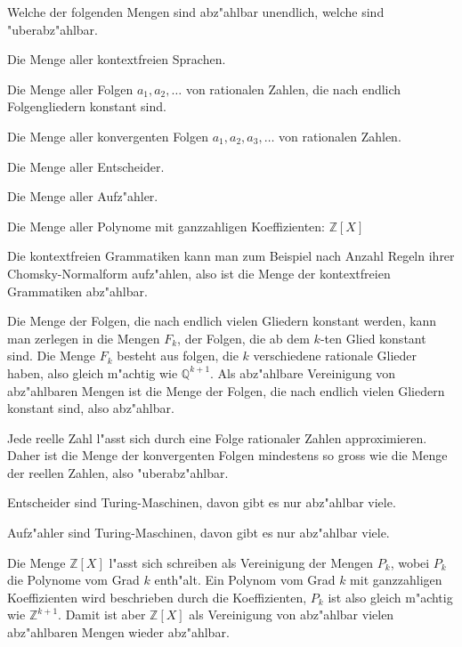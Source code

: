 Welche der folgenden Mengen sind abz"ahlbar unendlich, welche sind
"uberabz"ahlbar.
\begin{teilaufgaben}
\item Die Menge aller kontextfreien Sprachen.
\item Die Menge aller Folgen $a_1,a_2,\dots$ von rationalen Zahlen,
die nach endlich Folgengliedern konstant sind.
\item Die Menge aller konvergenten Folgen $a_1,a_2,a_3,\dots$ von
rationalen Zahlen.
\item Die Menge aller Entscheider.
\item Die Menge aller Aufz"ahler.
\item Die Menge aller Polynome mit ganzzahligen Koeffizienten:
${\mathbb Z}[X]$
\end{teilaufgaben}

\begin{loesung}
\begin{teilaufgaben}
\item Die kontextfreien Grammatiken kann man zum Beispiel nach
Anzahl Regeln ihrer Chomsky-Normalform aufz"ahlen, also ist
die Menge der kontextfreien Grammatiken abz"ahlbar.
\item Die Menge der Folgen, die nach endlich vielen Gliedern konstant
werden, kann man zerlegen in die Mengen $F_k$, der Folgen, die ab dem
$k$-ten Glied konstant sind. Die Menge $F_k$ besteht aus folgen, die
$k$ verschiedene rationale Glieder haben, also gleich m"achtig wie
$\mathbb Q^{k+1}$. Als abz"ahlbare Vereinigung von abz"ahlbaren Mengen
ist die Menge der Folgen, die nach endlich vielen Gliedern konstant sind,
also abz"ahlbar.
\item Jede reelle Zahl l"asst sich durch eine Folge rationaler Zahlen
approximieren. Daher ist die Menge der konvergenten Folgen mindestens
so gross wie die Menge der reellen Zahlen, also "uberabz"ahlbar.
\item Entscheider sind Turing-Maschinen, davon gibt es nur abz"ahlbar viele.
\item Aufz"ahler sind Turing-Maschinen, davon gibt es nur abz"ahlbar viele.
\item Die Menge ${\mathbb Z}[X]$ l"asst sich schreiben als Vereinigung
der Mengen $P_k$, wobei $P_k$ die Polynome vom Grad $k$ enth"alt.
Ein Polynom vom Grad $k$ mit ganzzahligen Koeffizienten wird beschrieben
durch die Koeffizienten, $P_k$ ist also gleich m"achtig wie $\mathbb Z^{k+1}$.
Damit ist aber ${\mathbb Z}[X]$ als Vereinigung von abz"ahlbar vielen
abz"ahlbaren Mengen wieder abz"ahlbar.
\qedhere
\end{teilaufgaben}
\end{loesung}

